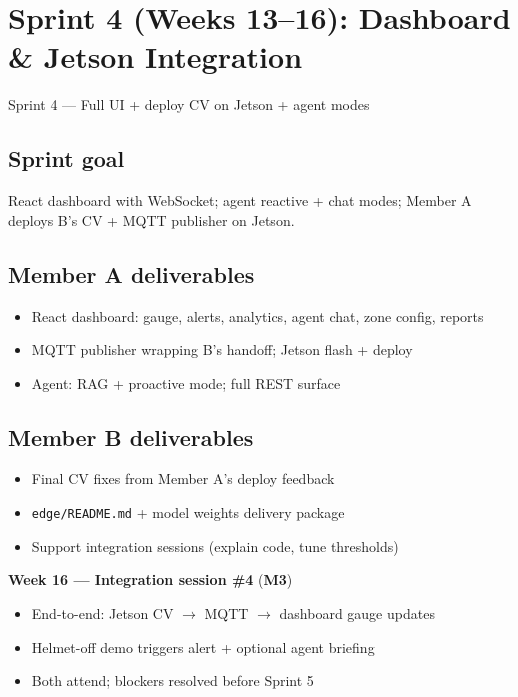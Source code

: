 \documentclass[12pt,a4paper]{article}
\begin{document}
\section{Sprint 4 (Weeks 13--16): Dashboard \& Jetson Integration}

\begin{sprintbox}{Sprint 4 --- Full UI + deploy CV on Jetson + agent modes}

\subsection*{Sprint goal}
React dashboard with WebSocket; agent reactive + chat modes; Member A deploys B's CV + MQTT publisher on Jetson.

\subsection*{Member A deliverables}
\begin{itemize}
    \item React dashboard: gauge, alerts, analytics, agent chat, zone config, reports
    \item MQTT publisher wrapping B's handoff; Jetson flash + deploy
    \item Agent: RAG + proactive mode; full REST surface
\end{itemize}

\subsection*{Member B deliverables}
\begin{itemize}
    \item Final CV fixes from Member A's deploy feedback
    \item \texttt{edge/README.md} + model weights delivery package
    \item Support integration sessions (explain code, tune thresholds)
\end{itemize}

\begin{collabbox}
\textbf{Week 16 --- Integration session \#4} (\textbf{M3})
\begin{itemize}
    \item End-to-end: Jetson CV $\rightarrow$ MQTT $\rightarrow$ dashboard gauge updates
    \item Helmet-off demo triggers alert + optional agent briefing
    \item Both attend; blockers resolved before Sprint 5
\end{itemize}
\end{collabbox}

\end{sprintbox}
\end{document}
